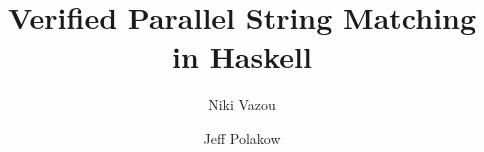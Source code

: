 \documentclass[nocopyrightspace, preprint]{llncs}
\title{Verified Parallel String Matching in Haskell}
\author{Niki Vazou\inst{1,2} \and Jeff Polakow\inst{2}}
\institute{$^1$UC San Diego \quad $^2$Awake Networks}
\begin{document}
\maketitle



\begin{abstract}

\end{abstract}











{


}
\end{document}
